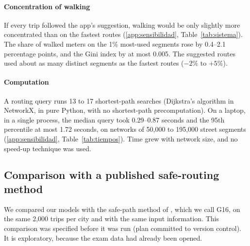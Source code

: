 \documentclass[preprint,12pt,authoryear]{elsarticle}
\begin{document}
\paragraph{Concentration of walking} If every trip followed the app's suggestion, walking would be only slightly more concentrated than on the fastest routes (\ref{app:sensibilidad}, Table~\ref{tab:sistema}). The share of walked meters on the 1\% most-used segments rose by 0.4--2.1 percentage points, and the Gini index by at most 0.005. The suggested routes used about as many distinct segments as the fastest routes ($-2\%$ to $+5\%$).

\paragraph{Computation} A routing query runs 13 to 17 shortest-path searches (Dijkstra's algorithm in NetworkX, in pure Python, with no shortest-path precomputation). On a laptop, in a single process, the median query took 0.29--0.87 seconds and the 95th percentile at most 1.72 seconds, on networks of 50,000 to 195,000 street segments (\ref{app:sensibilidad}, Table~\ref{tab:tiempos}). Time grew with network size, and no speed-up technique was used.

\subsection{Comparison with a published safe-routing method}
We compared our models with the safe-path method of \citet{galbrun2016safe}, which we call G16, on the same 2,000 trips per city and with the same input information. This comparison was specified before it was run (plan committed to version control). It is exploratory, because the exam data had already been opened.
\end{document}
